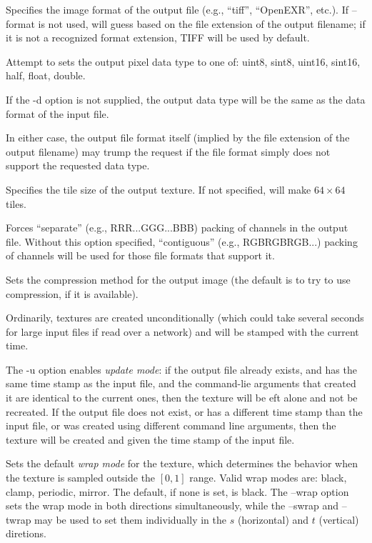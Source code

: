 Specifies the image format of the output file (e.g., ``tiff'',
``OpenEXR'', etc.).  If {\cf --format} is not used, \maketx will 
guess based on the file extension of the output filename; if it
is not a recognized format extension, TIFF will be used by default.
\apiend

Attempt to sets the output pixel data type to one of: {\cf uint8}, 
{\cf sint8}, {\cf uint16}, {\cf sint16}, {\cf half}, {\cf float}, 
{\cf double}.

If the {\cf -d} option is not supplied, the output data type will
be the same as the data format of the input file.

In either case, the output file format itself (implied by the file
extension of the output filename) may trump the request if the file
format simply does not support the requested data type.
\apiend

Specifies the tile size of the output texture.  If not specified,
\maketx will make $64 \times 64$ tiles.
\apiend

Forces ``separate'' (e.g., RRR...GGG...BBB) packing of channels in the
output file.  Without this option specified, ``contiguous'' (e.g.,
RGBRGBRGB...) packing of channels will be used for those file formats
that support it.
\apiend

Sets the compression method for the output image (the default is to try
to use  compression, if it is available).
\apiend

Ordinarily, textures are created unconditionally (which could take
several seconds for large input files if read over a network) and will
be stamped with the current time.

The {\cf -u} option enables \emph{update mode}: if the output file
already exists, and has the same time stamp as the input file, and
the command-lie arguments that created it are identical to the
current ones, then the texture will be eft alone and not be recreated.
If the output file does not exist, or has
a different time stamp than the input file, or was created using different
command line arguments, then the texture will be created
and given the time stamp of the input file.
\apiend

Sets the default \emph{wrap mode} for the texture, which determines
the behavior when the texture is sampled outside the $[0,1]$ range.
Valid wrap modes are: {\cf black}, {\cf clamp}, {\cf periodic},
{\cf mirror}.  The default, if none is set, is {\cf black}.  The
{\cf --wrap} option sets the wrap mode in both directions
simultaneously, while the {\cf --swrap} and {\cf --twrap} may be used to
set them individually in the $s$ (horizontal) and $t$ (vertical)
diretions.

